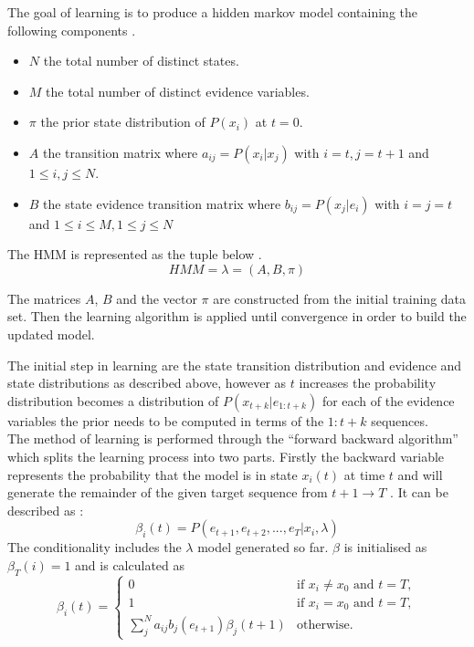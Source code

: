 \documentclass[11pt]{article}
\begin{document}
The goal of learning is to produce a hidden markov model containing the following components \cite{rab}.
\begin{itemize}

\item $N$ the total number of distinct states.

\item $M$ the total number of distinct evidence variables.

\item $\pi$ the prior state distribution of $P(x_i)$ at $t = 0$.

\item $A$ the transition matrix where $a_{ij} = P(x_i|x_j)$ with $i = t, j=t+1$ and $1 \le i,j \le N$.

\item $B$ the state evidence transition matrix where $b_{ij} = P(x_j|e_i)$ with $i = j = t$ and $1 \le i \le M, 1 \le j \le N$

\end{itemize}

The HMM is represented as the tuple below \cite{rab}.
$$
HMM = \lambda = (A, B, \pi)
$$

The matrices $A$, $B$ and the vector $\pi$ are constructed from the initial training data set. Then the learning algorithm is applied until convergence in order to build the updated model.

The initial step in learning are the state transition distribution and evidence and state distributions as described above, however as $t$ increases the probability distribution becomes a distribution of $P(x_{t+k}|e_{1:t+k})$ for each of the evidence variables the prior needs to be computed in terms of the  ${1:t+k}$ sequences. \\
The method of learning is performed through the ``forward backward algorithm'' which splits the learning process into two parts. Firstly the backward variable represents the probability that the model is in state $x_i(t)$ at time $t$ and will generate the remainder of the given target sequence from $t+1 \rightarrow T$ \cite{pc}. It can be described as \cite{rab}:
$$
\beta_i(t) = P(e_{t+1}, e_{t+2},...,e_T|x_i,\lambda)
$$
The conditionality includes the $\lambda$ model generated so far. $\beta$ is initialised as $\beta_T(i) = 1$ and is calculated as \cite{pc} 
\begin{equation*}
\beta_i(t) = \left\{
    \begin{array}{rl}
    0 &\text{if }x_i \neq x_0 \text{ and } t = T,\\
    1 &\text{if }x_i = x_0 \text{ and } t = T,\\
    \sum_j^N a_{ij}b_j(e_{t+1})\beta_j(t+1) & \text{otherwise}. 
    \end{array}
\right.
\end{equation*}
\end{document}
